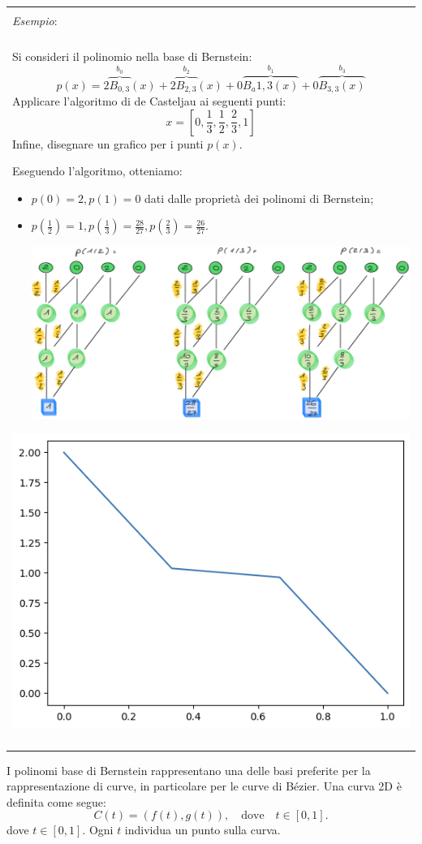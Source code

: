 \documentclass{article}
\numberwithin{equation}{section}
\newenvironment{example}
{\begin{center}
        \begin{tabular}{|p{0.9\textwidth}|}
            \hline \\ 
            \textit{Esempio}: \\\\ 
        }
        {
            \\\\ \hline
        \end{tabular}
    \end{center}
}
\begin{document}
\begin{example}
    Si consideri il polinomio nella base di Bernstein:
    $$p(x)=2\overbrace{B_{0,3}}^{b_0}(x)+2\overbrace{B_{2,3}}^{b_2}(x)+0\overbrace{B_a{1,3}(x)}^{b_1}+0\overbrace{B_{3,3}(x)}^{b_3}$$
    Applicare l'algoritmo di de Casteljau ai seguenti punti: 
    $$x=\left[0, \frac{1}{3},\frac{1}{2}, \frac{2}{3}, 1\right]$$
    Infine, disegnare un grafico per i punti $p(x)$.
    
    Eseguendo l'algoritmo, otteniamo:
    \begin{itemize}
       \item$p(0)=2, p(1)=0$ dati dalle proprietà dei polinomi di Bernstein;
       \item $p(\frac{1}{2})=1, p(\frac{1}{3})=\frac{28}{27},
       p(\frac{2}{3})=\frac{26}{27}$.

       \begin{center}
           \includegraphics[width=0.9\linewidth]{de_casteljau2}
       \end{center}
    \end{itemize}

    \begin{center}
        \includegraphics[width=0.5\linewidth]{de_casteljau}
    \end{center}
\end{example}
I polinomi base di Bernstein rappresentano una delle basi preferite per la
rappresentazione di curve, in particolare per le curve di Bézier.
Una curva 2D è definita come segue:
\[
C(t) = \left( f(t), g(t) \right), \quad \text{dove} \quad t \in [0,1].
\]
dove \( t \in [0,1] \). Ogni \( t \) individua un punto sulla curva.
\end{document}
